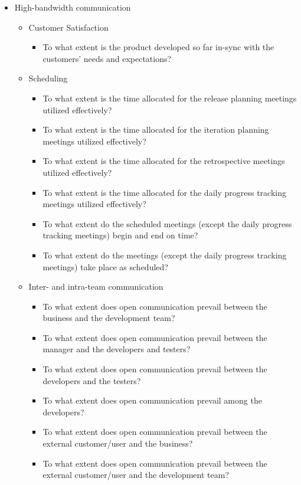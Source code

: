 \begin{appendices}
\begin{itemize}
\begin{itemize}
		\end{itemize}
	\item High-bandwidth communication
		\begin{itemize}
			\item Customer Satisfaction
				\begin{itemize}
					\item To what extent is the product developed so far in-sync with the customers' needs and expectations?
				\end{itemize}
			\item Scheduling
				\begin{itemize}
					\item To what extent is the time allocated for the release planning meetings utilized effectively? 
					\item To what extent is the time allocated for the iteration planning meetings utilized effectively?
					\item To what extent is the time allocated for the retrospective meetings utilized effectively? 
					\item To what extent is the time allocated for the daily progress tracking meetings utilized effectively? 
					\item To what extent do the scheduled meetings (except the daily progress tracking meetings) begin and end on time? 
					\item To what extent do the meetings (except the daily progress tracking meetings) take place as scheduled? 
				\end{itemize}
			\item Inter- and intra-team communication
				\begin{itemize}
					\item To what extent does open communication prevail between the business and the development team? 
					\item To what extent does open communication prevail between the manager and the developers and testers? 
					\item To what extent does open communication prevail between the developers and the testers? 
					\item To what extent does open communication prevail among the developers? 
					\item To what extent does open communication prevail between the external customer/user and the business? 
					\item To what extent does open communication prevail between the external customer/user and the development team? 

\end{itemize}
\end{itemize}
\end{itemize}
\end{appendices}
